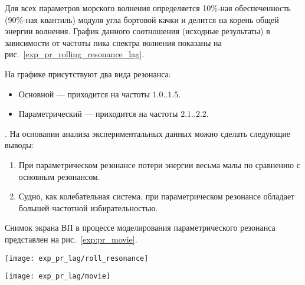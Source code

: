 Для всех параметров морского волнения определяется 10\%-ная обеспеченность (90\%-ная квантиль) модуля угла бортовой качки и делится на корень общей энергии волнения. График данного соотношения (исходные результаты) в зависимости от частоты пика спектра волнения показаны на рис.~\ref{exp_pr_rolling_resonance_lag}.

На графике присутствуют два вида резонанса:
\begin{itemize}
	\item	Основной --- приходится на частоты $1.0..1.5$.
	\item	Параметрический --- приходится на частоты $2.1..2.2$.
\end{itemize}


. На основании анализа экспериментальных данных можно сделать следующие выводы:
\begin{enumerate}
	\item	При параметрическом резонансе потери энергии весьма малы по сравнению с основным резонансом. 
	\item	Судно, как колебательная система, при параметрическом резонансе обладает большей частотной избирательностью.
\end{enumerate}

Снимок экрана ВП в процессе моделирования параметрического резонанса представлен на рис.~\ref{exp:pr_movie}.

\begin{sidewaysfigure}
	\begin{center}
	\texttt{[image: exp\_pr\_lag/roll\_resonance]}
	\end{center}
	\caption{Основной и параметрический резонанс бортовой качки}
	\label{exp_pr_rolling_resonance_lag}
\end{sidewaysfigure}


\begin{sidewaysfigure}
	\begin{center}
	\texttt{[image: exp\_pr\_lag/movie]}
	\end{center}
	\caption{Опасный крен вызванный параметрическим резонансом}
	\label{exp:pr_movie}
\end{sidewaysfigure}

